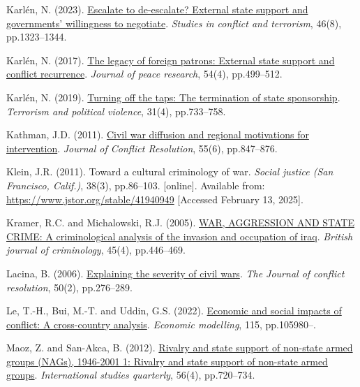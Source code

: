 \documentclass[
]{article}
\newlength{\cslhangindent}
\newenvironment{CSLReferences}[2] %
 {\begin{list}{}{%
  \setlength{\itemindent}{0pt}
  \setlength{\leftmargin}{0pt}
  \setlength{\parsep}{0pt}
  \ifodd #1
   \setlength{\leftmargin}{\cslhangindent}
   \setlength{\itemindent}{-1\cslhangindent}
  \fi
  \setlength{\itemsep}{#2\baselineskip}}}
 {\end{list}}
\begin{document}
\begin{CSLReferences}{0}{1}
Karlén, N. (2023).
\href{https://doi.org/10.1080/1057610X.2020.1835002}{Escalate to
de-escalate? External state support and governments' willingness to
negotiate}. \emph{Studies in conflict and terrorism}, 46(8),
pp.1323--1344.

Karlén, N. (2017). \href{https://doi.org/10.1177/0022343317700465}{The
legacy of foreign patrons: External state support and conflict
recurrence}. \emph{Journal of peace research}, 54(4), pp.499--512.

Karlén, N. (2019).
\href{https://doi.org/10.1080/09546553.2017.1282861}{Turning off the
taps: The termination of state sponsorship}. \emph{Terrorism and
political violence}, 31(4), pp.733--758.

Kathman, J.D. (2011).
\href{https://doi.org/10.1177/0022002711408009}{Civil war diffusion and
regional motivations for intervention}. \emph{Journal of Conflict
Resolution}, 55(6), pp.847--876.

Klein, J.R. (2011). Toward a cultural criminology of war. \emph{Social
justice (San Francisco, Calif.)}, 38(3), pp.86--103. {[}online{]}.
Available from: \url{https://www.jstor.org/stable/41940949} {[}Accessed
February 13, 2025{]}.

Kramer, R.C. and Michalowski, R.J. (2005).
\href{https://doi.org/10.1093/bjc/azi032}{WAR, AGGRESSION AND STATE
CRIME: A criminological analysis of the invasion and occupation of
iraq}. \emph{British journal of criminology}, 45(4), pp.446--469.

Lacina, B. (2006).
\href{https://doi.org/10.1177/0022002705284828}{Explaining the severity
of civil wars}. \emph{The Journal of conflict resolution}, 50(2),
pp.276--289.

Le, T.-H., Bui, M.-T. and Uddin, G.S. (2022).
\href{https://doi.org/10.1016/j.econmod.2022.105980}{Economic and social
impacts of conflict: A cross-country analysis}. \emph{Economic
modelling}, 115, pp.105980--.

Maoz, Z. and San-Akca, B. (2012).
\href{https://doi.org/10.1111/j.1468-2478.2012.00759.x}{Rivalry and
state support of non-state armed groups (NAGs), 1946-2001 1: Rivalry and
state support of non-state armed groups}. \emph{International studies
quarterly}, 56(4), pp.720--734.


\end{CSLReferences}
\end{document}
